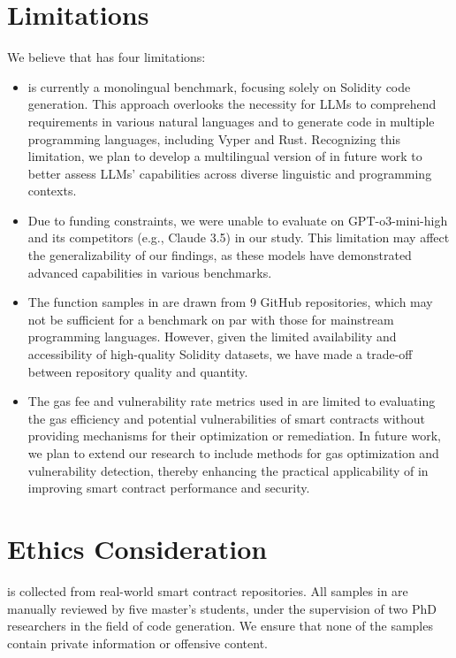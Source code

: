 \section*{Limitations}
We believe that \mytitle has four limitations:

\begin{itemize}[leftmargin=*]
    \item
    \mytitle is currently a monolingual benchmark, focusing solely on Solidity code generation.
    This approach overlooks the necessity for LLMs to comprehend requirements in various natural languages and to generate code in multiple programming languages, including Vyper and Rust.
    Recognizing this limitation, we plan to develop a multilingual version of \mytitle in future work to better assess LLMs' capabilities across diverse linguistic and programming contexts.
    \item
    Due to funding constraints, we were unable to evaluate \mytitle on GPT-o3-mini-high and its competitors (e.g., Claude 3.5) in our study. 
    This limitation may affect the generalizability of our findings, as these models have demonstrated advanced capabilities in various benchmarks.
    \item
    The function samples in \mytitle are drawn from 9 GitHub repositories, which may not be sufficient for a benchmark on par with those for mainstream programming languages. However, given the limited availability and accessibility of high-quality Solidity datasets, we have made a trade-off between repository quality and quantity.
    \item
    The gas fee and vulnerability rate metrics used in \mytitle are limited to evaluating the gas efficiency and potential vulnerabilities of smart contracts without providing mechanisms for their optimization or remediation.
    In future work, we plan to extend our research to include methods for gas optimization and vulnerability detection, thereby enhancing the practical applicability of \mytitle in improving smart contract performance and security.
\end{itemize}


\section*{Ethics Consideration}

\datasetname is collected from real-world smart contract repositories. 
All samples in \datasetname are manually reviewed by five master's students, under the supervision of two PhD researchers in the field of code generation. 
We ensure that none of the samples contain private information or offensive content.